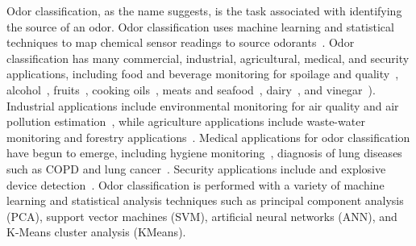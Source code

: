 Odor classification, as the name suggests, is the task associated with
identifying the source of an odor.  Odor classification uses machine learning
and statistical techniques to map chemical sensor readings to source
odorants~\cite{kaeppler2013odor, husni2017odor}. Odor classification has many
commercial, industrial, agricultural, medical, and security applications,
including food and beverage monitoring for spoilage and
quality~\cite{yu2008quality, pan2014early, chen2013classification,
yu2008identification, yu2009identification}, alcohol~\cite{
    zhang2021channel,buratti2004characterization,shi2019deep},
    fruits~\cite{pan2014early, chen2018characterization, chen2018development,
    du2019ripeness, rasekh2021nose, wu2017sensor}, cooking
    oils~\cite{karami2020application, teixeira2021application,
    rasekh2021classification}, meats and seafood~\cite{panigrahi2006design,
    wijaya2019noise, wijaya2021dwtlstm, aunsa2021electronic,
    grassi2022seafood}, dairy~\cite{yang2021application, labreche2005shelf},
    and vinegar~\cite{li2022physicochemical, anklam1998characterisation}).
    Industrial applications include environmental monitoring for air quality
    and air pollution estimation~\cite{caron2019identification,
    szulczynski2017different, tacstan2019real, de2008tinynose}, while
    agriculture applications include waste-water monitoring and forestry
    applications~\cite{wilson2013diverse, blanco2018development,
    lagod2019application, dewettinck2001electronic}. Medical applications for
    odor classification have begun to emerge, including hygiene
    monitoring~\cite{lorwongtragool2014novel}, diagnosis of lung diseases such
    as COPD and lung cancer~\cite{gardner2000electronic, va2021noninvasive,
    binson2021discrimination, d2010investigation}. Security applications
    include and explosive device detection~\cite{brudzewski2012metal,
    lopez2017electronic, sun2013liquid}. Odor classification is performed with
    a variety of machine learning and statistical analysis techniques such as
    principal component analysis (PCA), support vector machines (SVM),
    artificial neural networks (ANN), and K-Means cluster analysis (KMeans).

